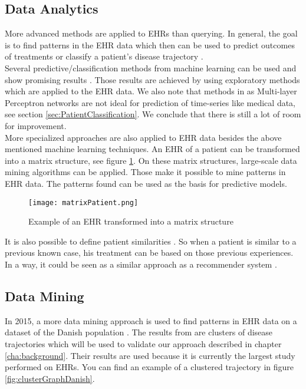\subsection{Data Analytics}

More advanced methods are applied to EHRs than querying. In general, the goal is to find patterns in the EHR data which then can be used to predict outcomes of treatments or classify a patient's disease trajectory \cite{EHRbigdata:slides}. \\

Several predictive/classification methods from machine learning can be used and show promising results \cite{EHRmining:article}. Those results are achieved by using exploratory methods which are applied to the EHR data. We also note that methods in \cite{EHRmining:article} as Multi-layer Perceptron networks are not ideal for prediction of time-series like medical data, see section \ref{sec:PatientClassification}. We conclude that there is still a lot of room for improvement. \\
 
More specialized approaches are also applied to EHR data \cite{EHRrecommender:article} besides the above mentioned machine learning techniques. 
An EHR of a patient can be transformed into a matrix structure, see figure \ref{fig:matrixPatient}. On these matrix structures, large-scale data mining algorithms can be applied. Those make it possible to mine patterns in EHR data. The patterns found can be used as the basis for predictive models.

\begin{figure}[!htb]
	\centering
	\texttt{[image: matrixPatient.png]}
	\caption{Example of an EHR transformed into a matrix structure \cite{EHRrecommender:article}}
	\label{fig:matrixPatient}
\end{figure}

It is also possible to define patient similarities \cite{EHRsimilarity:article}. So when a patient is similar to a previous known case, his treatment can be based on those previous experiences. In a way, it could be seen as a similar approach as a recommender system \cite{recommender:article}.


\subsection{Data Mining}

In 2015, a more data mining approach is used to find patterns in EHR data on a dataset of the Danish population \cite{Brunak:article}. The results from \cite{Brunak:article} are clusters of disease trajectories which will be used to validate our approach described in chapter \ref{cha:background}. Their results are used because it is currently the largest study performed on EHRs. You can find an example of a clustered trajectory in figure \ref{fig:clusterGraphDanish}. \\

